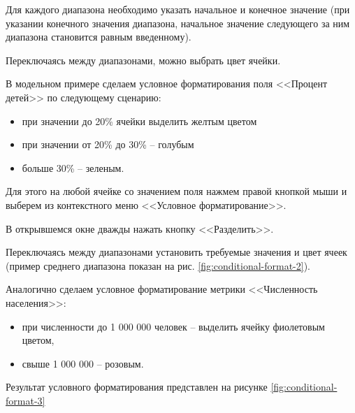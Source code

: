 \documentclass[../user-manual.tex]{subfiles}
\begin{document}
		
	Для каждого диапазона необходимо указать начальное и конечное значение (при указании конечного значения диапазона, начальное значение следующего за ним диапазона становится равным введенному).
	
	Переключаясь между диапазонами, можно выбрать цвет ячейки.
		
	\begin{modelExample}
		В модельном примере сделаем условное форматирования поля <<Процент детей>> по следующему сценарию:
		
		\begin{itemize}
			\item при значении до 20\% ячейки выделить желтым цветом
			\item при значении от 20\% до 30\% -- голубым
			\item больше 30\% -- зеленым.
		\end{itemize}
	
		Для этого на любой ячейке со значением поля нажмем правой кнопкой мыши и выберем из контекстного меню <<Условное форматирование>>.
		
		В открывшемся окне дважды нажать кнопку <<Разделить>>.
		
		Переключаясь между диапазонами установить требуемые значения и цвет ячеек (пример среднего диапазона показан на рис. \ref{fig:conditional-format-2}).
		
		Аналогично сделаем условное форматирование метрики <<Численность населения>>:
		
		\begin{itemize}
			\item при численности до 1 000 000 человек -- выделить ячейку фиолетовым цветом,
			\item свыше 1 000 000 -- розовым.
		\end{itemize}
		
		Результат условного форматирования представлен на рисунке \ref{fig:conditional-format-3}
	\end{modelExample}
\end{document}
